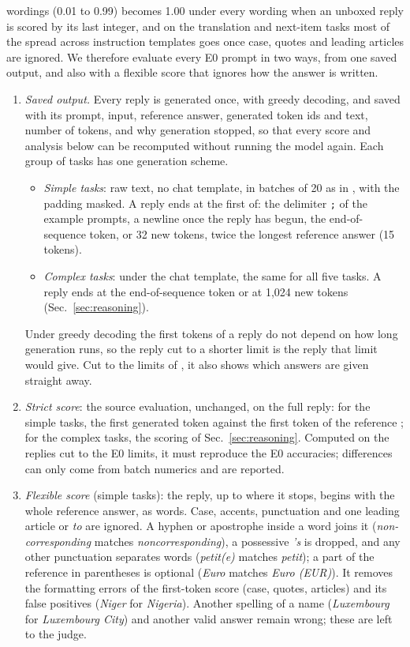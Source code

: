 \documentclass[11pt,a4paper]{article}
\begin{document}
wordings (0.01 to 0.99) becomes 1.00 under every wording when an unboxed reply is scored by its last integer, and on the translation and next-item tasks most of the spread across instruction templates goes once case, quotes and leading articles are ignored. We therefore evaluate every E0 prompt in two ways, from one saved output, and also with a flexible score that ignores how the answer is written.
\begin{enumerate}
\item \emph{Saved output.} Every reply is generated once, with greedy decoding, and saved with its prompt, input, reference answer, generated token ids and text, number of tokens, and why generation stopped, so that every score and analysis below can be recomputed without running the model again. Each group of tasks has one generation scheme.
\begin{itemize}
\item \emph{Simple tasks}: raw text, no chat template, in batches of 20 as in \citet{yang2026shared}, with the padding masked. A reply ends at the first of: the delimiter \texttt{;} of the example prompts, a newline once the reply has begun, the end-of-sequence token, or 32 new tokens, twice the longest reference answer (15 tokens).
\item \emph{Complex tasks}: under the chat template, the same for all five tasks. A reply ends at the end-of-sequence token or at 1,024 new tokens (Sec.~\ref{sec:reasoning}).
\end{itemize}
Under greedy decoding the first tokens of a reply do not depend on how long generation runs, so the reply cut to a shorter limit is the reply that limit would give. Cut to the limits of \citet[App.~A]{fu2026rules}, it also shows which answers are given straight away.
\item \emph{Strict score}: the source evaluation, unchanged, on the full reply: for the simple tasks, the first generated token against the first token of the reference \citep{yang2026shared}; for the complex tasks, the scoring of Sec.~\ref{sec:reasoning}. Computed on the replies cut to the E0 limits, it must reproduce the E0 accuracies; differences can only come from batch numerics and are reported.
\item \emph{Flexible score} (simple tasks): the reply, up to where it stops, begins with the whole reference answer, as words. Case, accents, punctuation and one leading article or \emph{to} are ignored. A hyphen or apostrophe inside a word joins it (\emph{non-corresponding} matches \emph{noncorresponding}), a possessive \emph{'s} is dropped, and any other punctuation separates words (\emph{petit(e)} matches \emph{petit}); a part of the reference in parentheses is optional (\emph{Euro} matches \emph{Euro (EUR)}). It removes the formatting errors of the first-token score (case, quotes, articles) and its false positives (\emph{Niger} for \emph{Nigeria}). Another spelling of a name (\emph{Luxembourg} for \emph{Luxembourg City}) and another valid answer remain wrong; these are left to the judge.

\end{enumerate}
\end{document}
